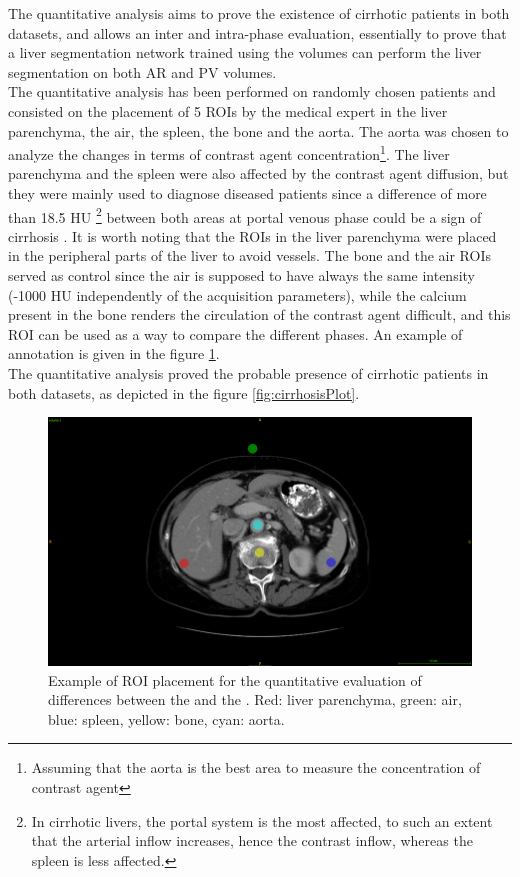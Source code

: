 The quantitative analysis aims to prove the existence of cirrhotic patients in both datasets, and allows an inter and intra-phase evaluation, essentially to prove that a liver segmentation network trained using the \textbf{} volumes can perform the liver segmentation on both AR and PV volumes. \\
The quantitative analysis has been performed on randomly chosen patients and consisted on the placement of 5 ROIs by the medical expert in the liver parenchyma, the air, the spleen, the bone and the aorta. The aorta was chosen to analyze the changes in terms of contrast agent concentration\footnote{Assuming that the aorta is the best area to measure the concentration of contrast agent}. The liver parenchyma and the spleen were also affected by the contrast agent diffusion, but they were mainly used to diagnose diseased patients since a difference of more than 18.5 HU \footnote{In cirrhotic livers, the portal system is the most affected, to such an extent that the arterial inflow increases, hence the contrast inflow, whereas the spleen is less affected.} between both areas at portal venous phase could be a sign of cirrhosis \cite{Wells2016}. It is worth noting that the ROIs in the liver parenchyma were placed in the peripheral parts of the liver to avoid vessels. The bone and the air ROIs served as control since the air is supposed to have always the same intensity (-1000 HU independently of the acquisition parameters), while the calcium present in the bone renders the circulation of the contrast agent difficult, and this ROI can be used as a way to compare the different phases. An example of annotation is given in the figure \ref{fig:roiPlacement}. \\
The quantitative analysis proved the probable presence of cirrhotic patients in both datasets, as depicted in the figure \ref{fig:cirrhosisPlot}.
\begin{figure}[!ht]
	\centering
	\includegraphics[width=0.6\linewidth]{../Contributions/images/Resizejuan_Roi_Example}
	\caption{Example of ROI placement for the quantitative evaluation of differences between the \textbf{} and the \textbf{}. Red: liver parenchyma, green: air, blue: spleen, yellow: bone, cyan: aorta.}
	\label{fig:roiPlacement}
\end{figure}
